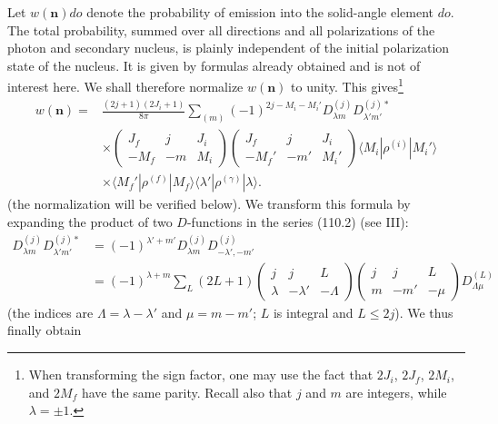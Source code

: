 Let $w(\mathbf n)do$ denote the probability of emission into the solid-angle element $do$. The total probability, summed over all directions and all polarizations of the photon and secondary nucleus, is plainly independent of the initial polarization state of the nucleus. It is given by formulas already obtained and is not of interest here. We shall therefore normalize $w(\mathbf n)$ to unity. This gives\footnote{When transforming the sign factor, one may use the fact that $2J_i$, $2J_f$, $2M_i$, and $2M_f$ have the same parity. Recall also that $j$ and $m$ are integers, while $\lambda=\pm1$.}
\[
\begin{split}
w(\mathbf n)={}&\frac{(2j+1)(2J_i+1)}{8\pi}
\sum_{(m)}(-1)^{2j-M_i-M_i'}D_{\lambda m}^{(j)}D_{\lambda'm'}^{(j)*}\\
&\times
\begin{pmatrix}J_f&j&J_i\\-M_f&-m&M_i\end{pmatrix}
\begin{pmatrix}J_f&j&J_i\\-M_f'&-m'&M_i'\end{pmatrix}
\langle M_i|\rho^{(i)}|M_i'\rangle\\
&\times\langle M_f'|\rho^{(f)}|M_f\rangle
\langle\lambda'|\rho^{(\gamma)}|\lambda\rangle .
\end{split}
\]
(the normalization will be verified below). We transform this formula by expanding the product of two $D$-functions in the series (110.2) (see III):
\[
\begin{split}
D_{\lambda m}^{(j)}D_{\lambda'm'}^{(j)*}
&=(-1)^{\lambda'+m'}D_{\lambda m}^{(j)}D_{-\lambda',-m'}^{(j)}\\
&=(-1)^{\lambda+m}\sum_L(2L+1)
\begin{pmatrix}j&j&L\\\lambda&-\lambda'&-\Lambda\end{pmatrix}
\begin{pmatrix}j&j&L\\m&-m'&-\mu\end{pmatrix}D_{\Lambda\mu}^{(L)}
\end{split}
\]
(the indices are $\Lambda=\lambda-\lambda'$ and $\mu=m-m'$; $L$ is integral and $L\leq2j$). We thus finally obtain
